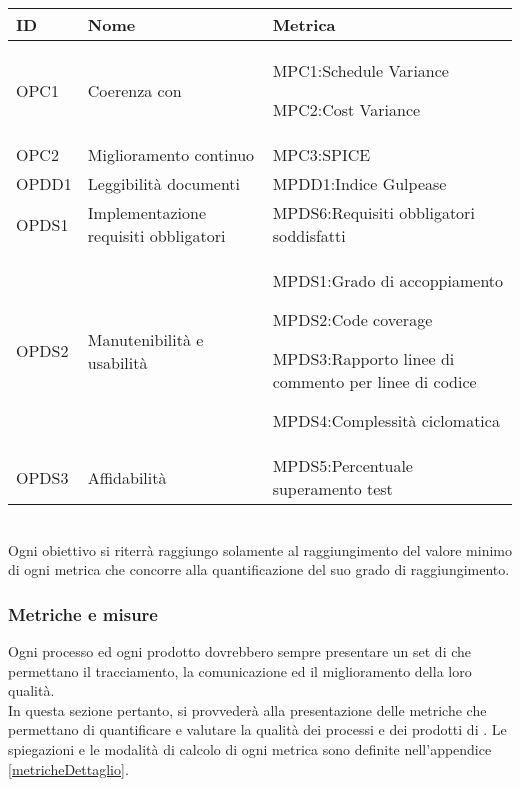			\begin{center}
			\begin{longtable}{ | >{\centering\arraybackslash}m{2cm} 
							   | >{\centering\arraybackslash}m{5.5cm} 
							   | >{\centering\arraybackslash}m{5.9cm} | }
        
        	\hline
        		\textbf{ID} & \textbf{Nome} & \textbf{Metrica} \\ \hline
        	\endhead
			        
				OPC1 & Coerenza con \PianoProgetto{} & 	MPC1:Schedule Variance\par
			        									MPC2:Cost Variance
			        									\\ \hline
				OPC2 &  Miglioramento continuo & MPC3:SPICE\\ \hline
				OPDD1 & Leggibilità documenti & MPDD1:Indice Gulpease\\ \hline
				OPDS1 & Implementazione requisiti obbligatori & MPDS6:Requisiti obbligatori soddisfatti\\ \hline
				OPDS2 & Manutenibilità e usabilità & 	MPDS1:Grado di accoppiamento\par
			        									MPDS2:Code coverage\par
			        									MPDS3:Rapporto linee di commento per linee di codice\par
			        									MPDS4:Complessità ciclomatica
			        									\\ \hline
				OPDS3 & Affidabilità & MPDS5:Percentuale superamento test\\ \hline
			\end{longtable}
			\end{center}\\

			Ogni obiettivo si riterrà raggiungo solamente al raggiungimento del valore minimo
			di ogni metrica che concorre alla quantificazione del suo grado di raggiungimento. 

	\subsubsection{Metriche e misure}
		\label{subsec:metriche}

		Ogni processo ed ogni prodotto dovrebbero sempre presentare un set di  
		che permettano il tracciamento, la comunicazione ed il miglioramento della loro qualità.\\
		In questa sezione pertanto, si provvederà alla presentazione delle metriche che permettano
		di quantificare e valutare la qualità dei processi e dei prodotti di \GroupName{}.
		Le spiegazioni e le modalità di calcolo di ogni metrica sono definite nell'appendice \ref{metricheDettaglio}.\\
		
